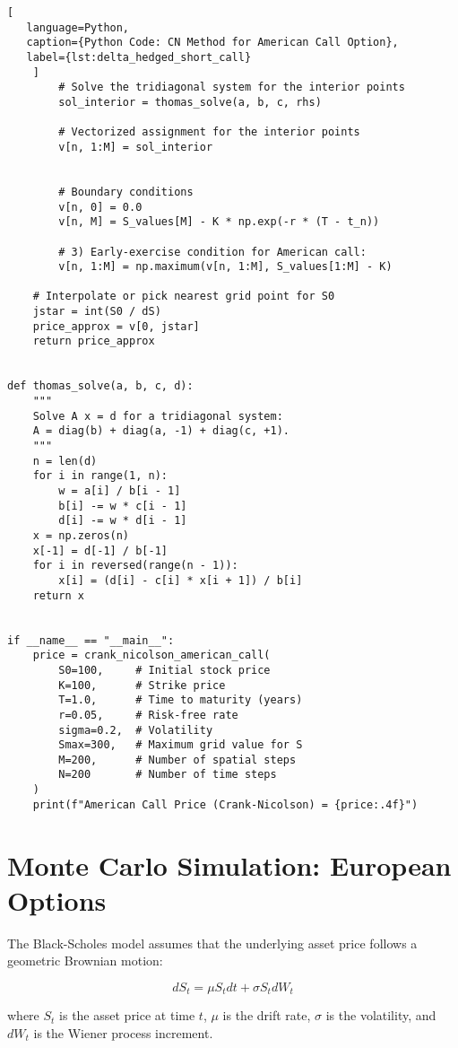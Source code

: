 \begin{lstlisting}[
   language=Python,
   caption={Python Code: CN Method for American Call Option},
   label={lst:delta_hedged_short_call}
    ]
        # Solve the tridiagonal system for the interior points
        sol_interior = thomas_solve(a, b, c, rhs)

        # Vectorized assignment for the interior points
        v[n, 1:M] = sol_interior


        # Boundary conditions
        v[n, 0] = 0.0
        v[n, M] = S_values[M] - K * np.exp(-r * (T - t_n))

        # 3) Early-exercise condition for American call:
        v[n, 1:M] = np.maximum(v[n, 1:M], S_values[1:M] - K)

    # Interpolate or pick nearest grid point for S0
    jstar = int(S0 / dS)
    price_approx = v[0, jstar]
    return price_approx


def thomas_solve(a, b, c, d):
    """
    Solve A x = d for a tridiagonal system:
    A = diag(b) + diag(a, -1) + diag(c, +1).
    """
    n = len(d)
    for i in range(1, n):
        w = a[i] / b[i - 1]
        b[i] -= w * c[i - 1]
        d[i] -= w * d[i - 1]
    x = np.zeros(n)
    x[-1] = d[-1] / b[-1]
    for i in reversed(range(n - 1)):
        x[i] = (d[i] - c[i] * x[i + 1]) / b[i]
    return x


if __name__ == "__main__":
    price = crank_nicolson_american_call(
        S0=100,     # Initial stock price
        K=100,      # Strike price
        T=1.0,      # Time to maturity (years)
        r=0.05,     # Risk-free rate
        sigma=0.2,  # Volatility
        Smax=300,   # Maximum grid value for S
        M=200,      # Number of spatial steps
        N=200       # Number of time steps
    )
    print(f"American Call Price (Crank-Nicolson) = {price:.4f}")

   \end{lstlisting}


\section{Monte Carlo Simulation: European Options}
    \label{sec:mc_sim}

    The Black-Scholes model assumes that the underlying asset price follows a geometric Brownian motion:

    \begin{equation}
        dS_t = \mu S_t dt + \sigma S_t dW_t
        \label{eq:geometric_brownian_bs}
    \end{equation}

    where $S_t$ is the asset price at time $t$, $\mu$ is the drift rate, $\sigma$ is the volatility,
    and $dW_t$ is the Wiener process increment.

